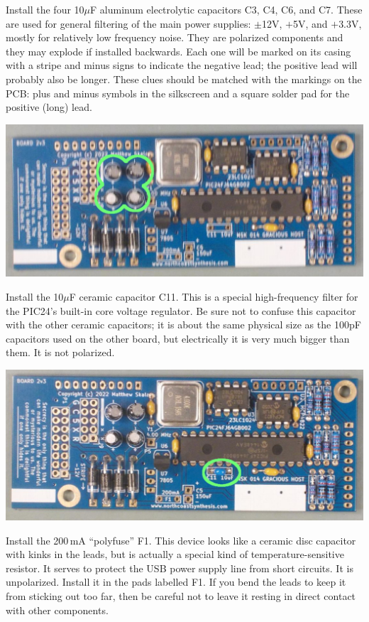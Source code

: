 Install the four 10$\mu$F aluminum electrolytic capacitors C3, C4, C6, and
C7.  These are used for general filtering of the main power supplies:
$\pm$12V, $+$5V, and $+$3.3V, mostly for relatively low frequency noise.
They are polarized components and they may explode if installed backwards. 
Each one will be marked on its casing with a stripe and minus signs to
indicate the negative lead; the positive lead will probably also be longer. 
These clues should be matched with the markings on the PCB: plus and minus
symbols in the silkscreen and a square solder pad for the positive (long)
lead.

\nopagebreak
\noindent\includegraphics[width=\linewidth]{cap-10u.jpg}

Install the 10$\mu$F ceramic capacitor C11.  This is a special
high-frequency filter for the PIC24's built-in core voltage regulator.  Be
sure not to confuse this capacitor with the other ceramic capacitors; it
is about the same physical size as the 100pF capacitors used on the other
board, but electrically it is very much bigger than them.  It is not
polarized.

\nopagebreak
\noindent\includegraphics[width=\linewidth]{cap-10ucer.jpg}

Install the 200\,mA ``polyfuse'' F1.  This device looks like a ceramic disc
capacitor with kinks in the leads, but is actually a special
kind of temperature-sensitive resistor.  It serves to protect the USB power
supply line from short circuits.  It is unpolarized.  Install it in the pads
labelled F1.  If you bend the leads to keep it from sticking out too far,
then be careful not to leave it resting in direct contact with other
components.


